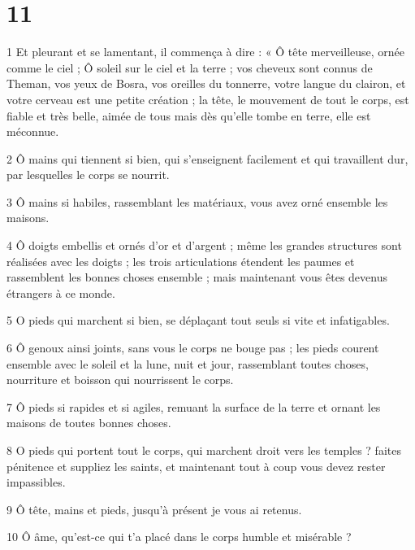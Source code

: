 \chapter{11}


\par 1 Et pleurant et se lamentant, il commença à dire : « Ô tête merveilleuse, ornée comme le ciel ; Ô soleil sur le ciel et la terre ; vos cheveux sont connus de Theman, vos yeux de Bosra, vos oreilles du tonnerre, votre langue du clairon, et votre cerveau est une petite création ; la tête, le mouvement de tout le corps, est fiable et très belle, aimée de tous mais dès qu'elle tombe en terre, elle est méconnue.

\par 2 Ô mains qui tiennent si bien, qui s'enseignent facilement et qui travaillent dur, par lesquelles le corps se nourrit.

\par 3 Ô mains si habiles, rassemblant les matériaux, vous avez orné ensemble les maisons.

\par 4 Ô doigts embellis et ornés d'or et d'argent ; même les grandes structures sont réalisées avec les doigts ; les trois articulations étendent les paumes et rassemblent les bonnes choses ensemble ; mais maintenant vous êtes devenus étrangers à ce monde.

\par 5 O pieds qui marchent si bien, se déplaçant tout seuls si vite et infatigables.

\par 6 Ô genoux ainsi joints, sans vous le corps ne bouge pas ; les pieds courent ensemble avec le soleil et la lune, nuit et jour, rassemblant toutes choses, nourriture et boisson qui nourrissent le corps.

\par 7 Ô pieds si rapides et si agiles, remuant la surface de la terre et ornant les maisons de toutes bonnes choses.

\par 8 O pieds qui portent tout le corps, qui marchent droit vers les temples ? faites pénitence et suppliez les saints, et maintenant tout à coup vous devez rester impassibles.

\par 9 Ô tête, mains et pieds, jusqu'à présent je vous ai retenus.

\par 10 Ô âme, qu'est-ce qui t'a placé dans le corps humble et misérable ?

